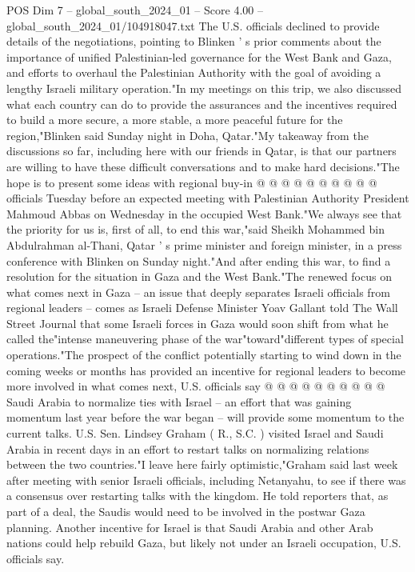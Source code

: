 \begin{textsample}{POS Dim 7 – global\_south\_2024\_01 – Score 4.00 – global\_south\_2024\_01/104918047.txt}
The U.S. officials declined to provide details of the negotiations, pointing to Blinken ' s prior comments about the importance of unified Palestinian-led governance for the West Bank and Gaza, and efforts to overhaul the Palestinian Authority with the goal of avoiding a lengthy Israeli military operation."In my meetings on this trip, we also discussed what each country can do to provide the assurances and the incentives required to build a more secure, a more stable, a more peaceful future for the region,"Blinken said Sunday night in Doha, Qatar."My takeaway from the discussions so far, including here with our friends in Qatar, is that our partners are willing to have these difficult conversations and to make hard decisions."The hope is to present some ideas with regional buy-in @ @ @ @ @ @ @ @ @ @ officials Tuesday before an expected meeting with Palestinian Authority President Mahmoud Abbas on Wednesday in the occupied West Bank."We always see that the priority for us is, first of all, to end this war,"said Sheikh Mohammed bin Abdulrahman al-Thani, Qatar ' s prime minister and foreign minister, in a press conference with Blinken on Sunday night."And after ending this war, to find a resolution for the situation in Gaza and the West Bank."The renewed focus on what comes next in Gaza -- an issue that deeply separates Israeli officials from regional leaders -- comes as Israeli Defense Minister Yoav Gallant told The Wall Street Journal that some Israeli forces in Gaza would soon shift from what he called the"intense maneuvering phase of the war"toward"different types of special operations."The prospect of the conflict potentially starting to wind down in the coming weeks or months has provided an incentive for regional leaders to become more involved in what comes next, U.S. officials say @ @ @ @ @ @ @ @ @ @ Saudi Arabia to normalize ties with Israel -- an effort that was gaining momentum last year before the war began -- will provide some momentum to the current talks.
U.S.
Sen.
Lindsey Graham ( R., S.C. ) visited Israel and Saudi Arabia in recent days in an effort to restart talks on normalizing relations between the two countries."I leave here fairly optimistic,"Graham said last week after meeting with senior Israeli officials, including Netanyahu, to see if there was a consensus over restarting talks with the kingdom.
He told reporters that, as part of a deal, the Saudis would need to be involved in the postwar Gaza planning.
Another incentive for Israel is that Saudi Arabia and other Arab nations could help rebuild Gaza, but likely not under an Israeli occupation, U.S. officials say.

\end{textsample}
